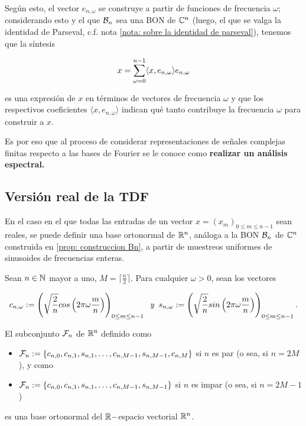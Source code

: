 Según esto, el vector $e_{n,\omega}$ se construye a partir
de funciones de frecuencia $\omega$; considerando esto
y el que $\mathcal{B}_{n}$ sea una BON de $\mathbb{C}^{n}$ (luego, el
que se valga la identidad de Parseval,
c.f. nota \ref{nota: sobre la identidad de parseval}), tenemos que
la síntesis

\[
x = \sum\limits_{\omega=0}^{n-1}\langle x, e_{n,\omega} \rangle e_{n,\omega}
\]

\noindent
es una expresión de $x$ en términos de vectores de frecuencia
$\omega$ y que los respectivos coeficientes 
$\langle x, e_{n,\omega} \rangle$ indican qué tanto 
contribuye la frecuencia $\omega$ para construir a $x$.

Es por eso que al proceso de considerar representaciones
de señales complejas finitas respecto a las bases de Fourier
se le conoce como  
\textbf{realizar un análisis espectral.}


\subsection{Versión real de la TDF}

En el caso en el que todas las entradas de un vector
$x = (x_{m})_{0 \leq m \leq n-1}$ sean reales, se puede definir
una base ortonormal de $\mathbb{R}^{n}$, 
análoga a la BON $\mathcal{B}_{n}$ de $\mathbb{C}^{n}$ construida en 
\ref{prop: construccion Bn},
a partir de muestreos uniformes
de sinusoides de frecuencias enteras.

\begin{prop}
\label{prop: base de fourier version real}
Sean $n \in \mathbb{N}$ mayor a uno, $M = \lceil \frac{n}{2} \rceil$.
Para cualquier $\omega >0$, sean los vectores 

	\begin{equation}
	\label{eq0: 10ab}
	c_{n, \omega} := \left( \sqrt{\frac{2}{n}} cos
	\left(2 \pi \omega \frac{m}{n}
	\right) \right)_{0 \leq m \leq n-1}
	\hspace{0.2cm} \textit{y} \hspace{0.2cm} 
	s_{n, \omega} := \left( \sqrt{\frac{2}{n}} sin
	\left(2 \pi \omega \frac{m}{n}
	\right) \right)_{0 \leq m \leq n-1}.
	\end{equation}

El subconjunto $\mathcal{F}_{n}$ de $\mathbb{R}^{n}$ definido como

	\begin{itemize}
	\item $\mathcal{F}_{n} : = \{ c_{n,0}, c_{n,1}, s_{n,1},
	\ldots , c_{n,M-1}, s_{n,M-1}, c_{n,M} \}$ si $n$ es par
	(o sea, si $n=2M$), y como
	\item $\mathcal{F}_{n} : = \{ c_{n,0}, c_{n,1}, s_{n,1},
	\ldots , c_{n,M-1}, s_{n,M-1} \}$ si $n$ es impar
	(o sea, si $n=2M-1$)
	\end{itemize}
	
es una base ortonormal del $\mathbb{R}-$espacio vectorial $\mathbb{R}^{n}$.
\end{prop}

